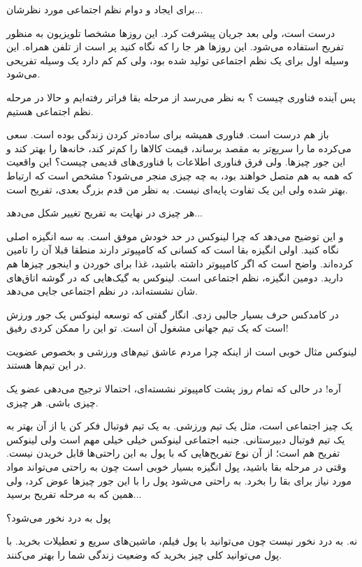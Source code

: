 \begin{dialogue}
\david
برای ایجاد و دوام نظم اجتماعی مورد نظرشان...

\linus
درست است، ولی بعد جریان پیشرفت کرد. این روزها مشخصا
تلویزیون به منظور تفریح استفاده می‌شود. این روزها هر جا را که نگاه کنید
پر است از تلفن همراه. این وسیله اول برای یک نظم اجتماعی تولید شده بود،
ولی کم کم دارد یک وسیله تفریحی می‌شود.

\david
پس آینده فناوری چیست ؟ به نظر می‌رسد از مرحله بقا فراتر
رفته‌ایم و حالا در مرحله نظم اجتماعی هستیم.

\linus
باز هم درست است. فناوری همیشه برای ساده‌تر کردن زندگی بوده
است. سعی می‌کرده ما را سریع‌تر به مقصد برساند، قیمت کالاها را کم‌تر کند،
خانه‌ها را بهتر کند و این جور چیزها. ولی فرق فناوری اطلاعات با
فناوری‌های قدیمی چیست؟ این واقعیت که همه به هم متصل خواهند بود، به چه
چیزی منجر می‌شود؟ مشخص است که ارتباط بهتر شده ولی این یک تفاوت پایه‌ای
نیست. به نظر من قدم بزرگ بعدی، تفریح است.

\david
هر چیزی در نهایت به تفریح تغییر شکل می‌دهد...

\linus
و این توضیح می‌دهد که چرا لینوکس در حد خودش موفق است. به سه
انگیزه اصلی نگاه کنید. اولی انگیزه بقا است که کسانی که کامپیوتر دارند
منطقا قبلا آن را تامین کرده‌اند. واضح است که اگر کامپیوتر داشته باشید،
غذا برای خوردن و اینجور چیزها هم دارید. دومین انگیزه، نظم اجتماعی
است. لینوکس به گیک‌هایی که در گوشه اتاق‌های شان نشسته‌اند، در نظم اجتماعی
جایی می‌دهد.

\david
در کامدکس حرف بسیار جالبی زدی. انگار گفتی که توسعه لینوکس یک جور ورزش
است که یک تیم جهانی مشغول آن است. تو این را ممکن کردی رفیق!

\linus
لینوکس مثال خوبی است از اینکه چرا مردم عاشق تیم‌های ورزشی و
بخصوص عضویت در این تیم‌ها هستند.

\david
آره!‌ در حالی که تمام روز پشت کامپیوتر نشسته‌ای، احتمالا
ترجیح می‌دهی عضو یک چیزی باشی. هر چیزی.

\linus
یک چیز اجتماعی است، مثل یک تیم ورزشی. به یک تیم فوتبال فکر
کن یا از آن بهتر به یک تیم فوتبال دبیرستانی. جنبه اجتماعی لینوکس خیلی
خیلی مهم است ولی لینوکس تفریح هم است؛ از آن نوع تفریح‌هایی که با پول به
این راحتی‌ها قابل خریدن نیست. وقتی در مرحله بقا باشید، پول انگیزه بسیار
خوبی است چون به راحتی می‌تواند مواد مورد نیاز برای بقا را بخرد.  به
راحتی می‌شود پول را با این جور چیزها عوض کرد، ولی همین که به مرحله
تفریح برسید...

\david
پول به درد نخور می‌شود؟

\linus
نه. به درد نخور نیست چون می‌توانید با پول فیلم، ماشین‌های
سریع و تعطیلات بخرید. با پول می‌توانید کلی چیز بخرید که وضعیت زندگی شما
را بهتر می‌کنند.


\end{dialogue}
